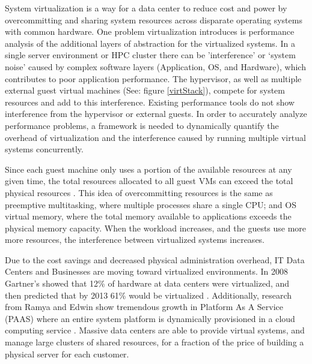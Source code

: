 System virtualization is a way for a data center to reduce cost and power by overcommitting and sharing system resources across disparate operating systems with common hardware.  One problem virtualization introduces is performance analysis of the additional layers of abstraction for the virtualized systems.  
In a single server environment or HPC cluster there can be 'interference' \cite{paul} or ‘system noise' caused by complex software layers (Application, OS, and Hardware), which contributes to poor application performance.  
The hypervisor, as well as multiple external guest virtual machines (See: figure \ref{virtStack}), compete for system resources and add to this interference.  Existing performance tools do not show interference from the hypervisor or external guests.  In order to accurately analyze performance problems, a framework is needed to dynamically quantify the overhead of virtualization and the interference caused by running multiple virtual systems concurrently.

\indent Since each guest machine only uses a portion of the available resources at any given time, the total resources allocated to all guest VMs can exceed the total physical resources \cite{huber2, amit, buell1}.   This idea of overcommitting resources is the same as preemptive multitasking, where multiple processes share a single CPU; and OS virtual memory, where the total memory available to applications exceeds the physical memory capacity.  When the workload increases, and the guests use more more resources, the interference between virtualized systems increases. 

\indent Due to the cost savings and decreased physical administration overhead, IT Data Centers and Businesses are moving toward virtualized environments.  In 2008 Gartner’s showed that 12\% of hardware at data centers were virtualized, and then predicted that by 2013 61\% would be virtualized \cite{gartners}.   Additionally, research from Ramya and Edwin show tremendous growth in Platform As A Service (PAAS) where an entire system platform is dynamically provisioned in a cloud computing service \cite{ramya}.   Massive data centers are able to provide virtual systems, and manage large clusters of shared resources, for a fraction of the price of building a physical server for each customer.

